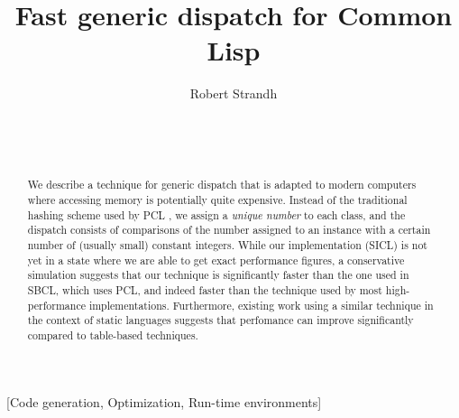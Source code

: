 \documentclass{acm_proc_article-sp}
\def\inputtex#1{}
\begin{document}
\title{Fast generic dispatch for Common Lisp}
\author{\alignauthor
Robert Strandh\\
\\
\\
\\
}


\maketitle

\begin{abstract}
We describe a technique for generic dispatch that is adapted to modern
computers where accessing memory is potentially quite expensive.
Instead of the traditional hashing scheme used by PCL
\cite{Kiczales:1990:EMD:91556.91600}, we assign a \emph{unique number}
to each class, and the dispatch consists of comparisons of the number
assigned to an instance with a certain number of (usually small)
constant integers.  While our implementation (SICL) is not yet in a
state where we are able to get exact performance figures, a
conservative simulation suggests that our technique is significantly
faster than the one used in SBCL, which uses PCL, and indeed faster
than the technique used by most high-performance \cl{}
implementations.  Furthermore, existing work
\cite{Zendra:1997:EDD:263698.263728} using a similar technique in the
context of static languages suggests that perfomance can improve
significantly compared to table-based techniques.
\end{abstract}

[Code generation, Optimization, Run-time environments]

\inputtex{sec-introduction.tex}
\inputtex{sec-previous.tex}
\inputtex{sec-our-method.tex}
\inputtex{sec-performance.tex}
\inputtex{sec-conclusions.tex}
\inputtex{sec-acknowledgements.tex}



\end{document}
